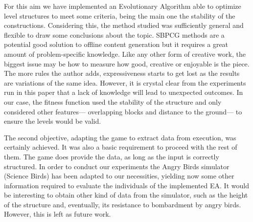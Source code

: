 \documentclass[sigconf]{acmart}
\begin{document}
For this aim we have implemented an Evolutionary Algorithm able to optimize 
level structures to meet some criteria, being the main one the stability of the 
constructions.
Considering this, the method studied was
sufficiently general and flexible to draw some conclusions about the
topic. SBPCG methods are a potential good solution to offline content
generation but it requires a great amount of problem-specific
knowledge. Like any other form of creative work, the biggest issue may
be how to measure how good, creative or enjoyable is the piece. The
more rules the author adds, expressiveness starts to get lost as the
results are variations of the same idea. However, it is crystal clear
from the experiments run in this paper that a lack of knowledge
will lead to unexpected outcomes.
In our case, the fitness function used the 
stability of the structure and only considered other features--- overlapping 
blocks and distance to the ground--- to ensure the levels would be valid.


The second objective, adapting the game to extract data from execution, was 
certainly achieved. It was also a basic requirement to proceed with the rest of 
them. The game does provide the data, as long as the input is correctly 
structured. 
In order to conduct our experiments the Angry Birds simulator (Science Birds) 
has been adapted to our necessities, yielding now some  other information 
required to evaluate the individuals of the implemented EA.
It would be interesting to obtain other kind of data from the simulator,
such as the height of the structure and, eventually, its resistance to
bombardment by angry birds. However, this is left as future work.
\end{document}
